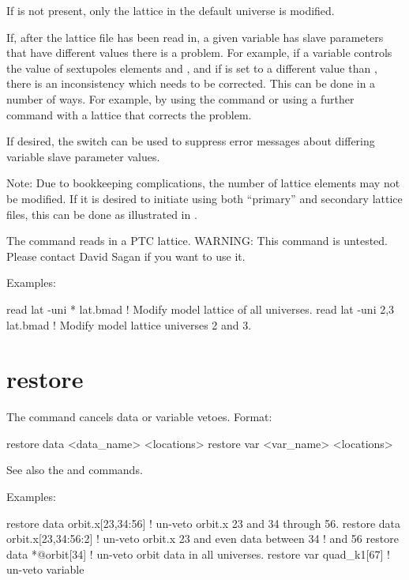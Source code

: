 If  is not present, only the  lattice
in the default universe is modified.

If, after the lattice file has been read in, a given \tao variable has slave parameters that have
different values there is a problem. For example, if a \tao variable controls the  value of
sextupoles elements  and , and if  is set to a different value than ,
there is an inconsistency which needs to be corrected. This can be done in a number of ways. For
example, by using the  command or using a further  command with
a lattice that corrects the problem.

If desired, the  switch can be used to suppress error messages about differing \tao
variable slave parameter values.

Note: Due to bookkeeping complications, the number of lattice elements may not be modified. If it is
desired to initiate \tao using both ``primary'' and secondary lattice files, this can be done as
illustrated in .

The  command reads in a PTC lattice. WARNING: This command is untested. Please contact
David Sagan if you want to use it.

Examples:
\begin{example}
  read lat -uni * lat.bmad   ! Modify model lattice of all universes.
  read lat -uni 2,3 lat.bmad ! Modify model lattice universes 2 and 3.
\end{example}

\section{restore}
\label{s:restore}

The  command cancels data or variable
vetoes. Format:
\begin{example}
  restore data  <data_name> <locations>
  restore var <var_name> <locations>
\end{example}

\vskip 10pt 

See also the  and  commands.

Examples:
\begin{example}
  restore data orbit.x[23,34:56]   ! un-veto orbit.x 23 and 34 through 56.
  restore data orbit.x[23,34:56:2] ! un-veto orbit.x 23 and even data between 34 
                                   !                                          and 56
  restore data *@orbit[34]         ! un-veto orbit data in all universes.
  restore var quad_k1[67]          ! un-veto variable
\end{example}

